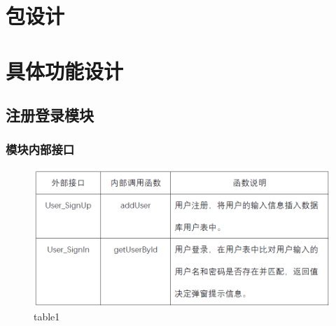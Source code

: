 \section{包设计}
\section{具体功能设计}
\subsection{注册登录模块}
\subsubsection{模块内部接口}
\begin{figure}[!htb]
	\centering
	\includegraphics[scale=1]{image/b1.png} %
	\caption{table1} %
\end{figure}
